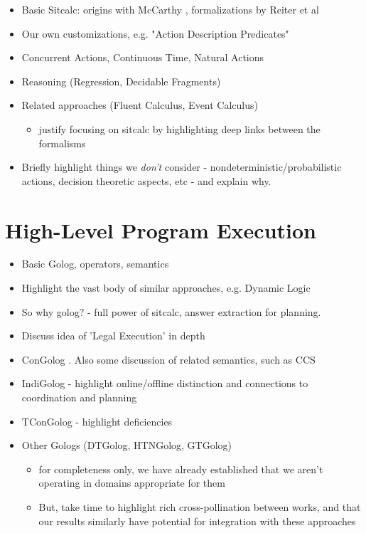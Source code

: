 \begin{itemize}
\item Basic Sitcalc: origins with McCarthy \cite{McCHay69sitcalc}, formalizations by Reiter et al \cite{reiter01kia,pirri99contributions_sitcalc,levesque98sc_foundations}
\item Our own customizations, e.g. "Action Description Predicates" \cite{kelly07sc_persistence}
\item Concurrent Actions, Continuous Time, Natural Actions \cite{pinto94temporal,reiter96sc_nat_conc}
\item Reasoning (Regression, Decidable Fragments)
\item Related approaches (Fluent Calculus, Event Calculus)
  \begin{itemize}
  \item justify focusing on sitcalc by highlighting deep links between the formalisms
  \end{itemize}
\item Briefly highlight things we \emph{don't} consider - nondeterministic/probabilistic actions, decision theoretic aspects, etc - and explain why.
\end{itemize}

\section{High-Level Program Execution}

\begin{itemize}
\item Basic Golog, operators, semantics \cite{levesque97golog}
\item Highlight the vast body of similar approaches, e.g. Dynamic Logic
\item So why golog? - full power of sitcalc, answer extraction for planning.
\item Discuss idea of 'Legal Execution' in depth
\item ConGolog \cite{giacomo00congolog}.  Also some discussion of related
semantics, such as CCS 
\item IndiGolog - highlight online/offline distinction and connections to coordination and planning \cite{giacomo99indigolog}
\item TConGolog - highlight deficiencies \cite{pinto99tcongolog}
\item Other Gologs (DTGolog, HTNGolog, GTGolog)
  \begin{itemize}
  \item for completeness only, we have already established that we aren't operating in domains appropriate for them
  \item But, take time to highlight rich cross-pollination between works, and that our results similarly have potential for integration with these approaches
  \end{itemize}
\end{itemize}


